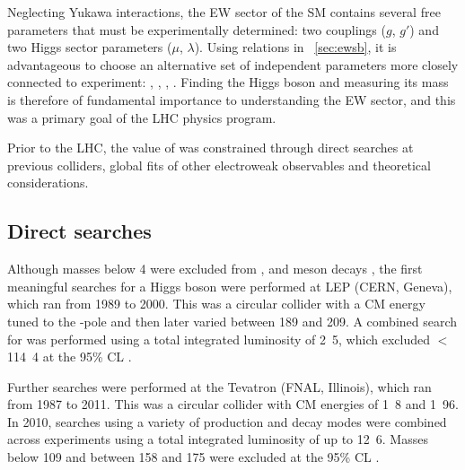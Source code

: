 
Neglecting Yukawa interactions, the \ac{EW} sector of the \ac{SM} contains several free 
parameters that must be experimentally determined: two couplings ($g$, $g'$) and two 
Higgs sector parameters ($\mu$, $\lambda$). Using relations in \Section~\ref{sec:ewsb}, 
it is advantageous to choose an alternative set of independent parameters more closely 
connected to experiment: \alphaEM, \mW, \mZ, \mH. Finding the Higgs boson and 
measuring its mass is therefore of fundamental importance to understanding the \ac{EW} 
sector, and this was a primary goal of the \ac{LHC} physics program.

Prior to the \ac{LHC}, the value of \mH was constrained through direct searches at 
previous colliders, global fits of other electroweak observables and theoretical 
considerations.



\subsection{Direct searches}
\label{sec:prior_constraints:direct}

Although masses below \unit{4}{\GeV} were excluded from \PB, \PUpsilon and \PK meson 
decays \cite{PDG:1988}, the first meaningful searches for a Higgs boson were 
performed at \acs{LEP} (CERN, Geneva), which ran from 1989 to 2000. This was a circular 
\epluseminus collider with a \ac{CM} energy tuned to the \PZ-pole and then later varied 
between 189 and \unit{209}{\GeV}. A combined search for \ZH was performed using a total 
integrated luminosity of \unit{2.5}{\invfb}, which excluded \mH $<$ \unit{114.4}{\GeV} at 
the 95\% \ac{CL} \cite{LEP:2003}.

Further searches were performed at the Tevatron (FNAL, Illinois), which ran from 1987
to 2011. This was a circular \ppbar collider with \ac{CM} energies of \unit{1.8}{\TeV}
and \unit{1.96}{\TeV}. In 2010, searches using a variety of production and decay modes 
were combined across experiments using a total integrated luminosity of up to
\unit{12.6}{\invfb}. Masses below \unit{109}{\GeV} and between 158 and \unit{175}{\GeV} 
were excluded at the 95\% \ac{CL} \cite{Tevatron:2010}.




